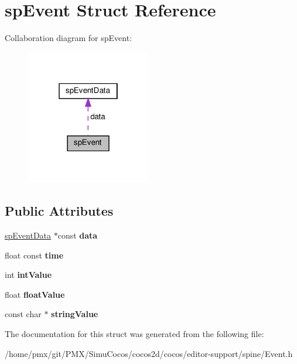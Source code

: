 \hypertarget{structspEvent}{}\section{sp\+Event Struct Reference}
\label{structspEvent}


Collaboration diagram for sp\+Event\+:
\nopagebreak
\begin{figure}[H]
\begin{center}
\leavevmode
\includegraphics[width=154pt]{structspEvent__coll__graph}
\end{center}
\end{figure}
\subsection*{Public Attributes}
\begin{DoxyCompactItemize}
\item 
\mbox{\label{structspEvent_a83d832095dd816ab78079a0e3348e866}} 
\hyperlink{structspEventData}{sp\+Event\+Data} $\ast$const {\bfseries data}
\item 
\mbox{\label{structspEvent_a9a6feb49bf5808a7a5c8de31bfbefb48}} 
float const {\bfseries time}
\item 
\mbox{\label{structspEvent_a318ac1a18986c24f0c4473d15beb8f3e}} 
int {\bfseries int\+Value}
\item 
\mbox{\label{structspEvent_a04ba40a5c5d311cc46f9d2a80dc11c5d}} 
float {\bfseries float\+Value}
\item 
\mbox{\label{structspEvent_a8972c3d5969ba611a73893dd7cae2c27}} 
const char $\ast$ {\bfseries string\+Value}
\end{DoxyCompactItemize}


The documentation for this struct was generated from the following file\+:\begin{DoxyCompactItemize}
\item 
/home/pmx/git/\+P\+M\+X/\+Simu\+Cocos/cocos2d/cocos/editor-\/support/spine/Event.\+h\end{DoxyCompactItemize}
